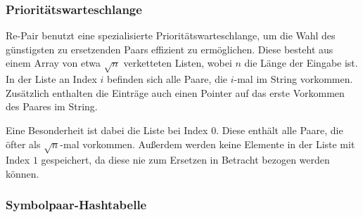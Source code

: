 \subsubsection{Prioritätswarteschlange}

Re-Pair benutzt eine spezialisierte Prioritätswarteschlange, um die Wahl des günstigsten zu ersetzenden Paars effizient zu ermöglichen. Diese besteht aus einem Array von etwa $\sqrt{n}$ verketteten Listen, wobei $n$ die Länge der Eingabe ist. In der Liste an Index $i$ befinden sich alle Paare, die $i$-mal im String vorkommen. Zusätzlich enthalten die Einträge auch  einen Pointer auf das erste Vorkommen des Paares im String.

Eine Besonderheit ist dabei die Liste bei Index $0$. Diese enthält alle Paare, die öfter als $\sqrt{n}$-mal vorkommen. Außerdem werden keine Elemente in der Liste mit Index $1$ gespeichert, da diese nie zum Ersetzen in Betracht bezogen werden können.
 
\subsubsection{Symbolpaar-Hashtabelle}


